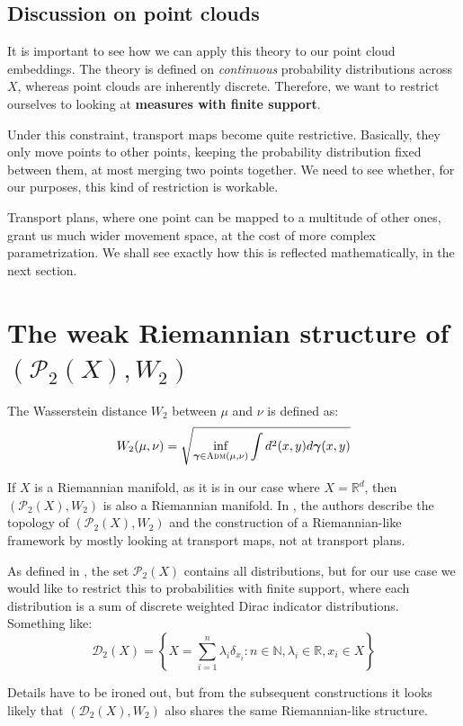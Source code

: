 \documentclass{article}
\begin{document}
\subsection{Discussion on point clouds}

It is important to see how we can apply this theory to our point cloud embeddings.
The theory is defined on \textit{continuous} probability distributions across
$X$, whereas point clouds are inherently discrete. Therefore, we want to restrict
ourselves to looking at \textbf{measures with finite support}.

Under this constraint, transport maps become quite restrictive. Basically,
they only move points to other points, keeping the probability distribution
fixed between them, at most merging two points together. We need to see 
whether, for our purposes, this kind of restriction is workable.

Transport plans, where one point can be mapped to a multitude of other ones,
grant us much wider movement space, at the cost of more complex parametrization.
We shall see exactly how this is reflected mathematically, in the next 
section.

\section{The weak Riemannian structure of $(\mathscr{P}_2(X), W_2)$}

The Wasserstein distance $W_2$ between $\mu$ and $\nu$ is 
defined as:
\[W_2(\mu, \nu) = \sqrt{\inf_{\bm\gamma\in \textsc{Adm}(\mu, \nu)} \int d^2(x,y)d\bm\gamma(x,y)} \]

If $X$ is a Riemannian manifold, as it is in our case where $X=\mathbb{R}^d$,
then $(\mathscr{P}_2(X), W_2)$ is also a Riemannian manifold. In 
\cite{ambgigli2011}, the authors describe the topology of $(\mathscr{P}_2(X), W_2)$
and the construction of a Riemannian-like framework by mostly looking at
transport maps, not at transport plans.

As defined in \cite{ambgigli2011}, the set $\mathscr{P}_2(X)$ contains all 
distributions, but for our use case we would like to restrict this to 
probabilities with finite support, where each distribution is a sum of 
discrete weighted Dirac indicator distributions. Something like:
\[\mathscr{D}_2(X) = \left\{X = \sum_{i=1}^{n}\lambda_i\delta_{x_i} : 
n\in \mathbb{N}, \lambda_i\in\mathbb{R}, x_i\in X \right\} \]

Details have to be ironed out, but from the subsequent constructions it
looks likely that $(\mathscr{D}_2(X), W_2)$ also shares the same 
Riemannian-like structure.
\end{document}
